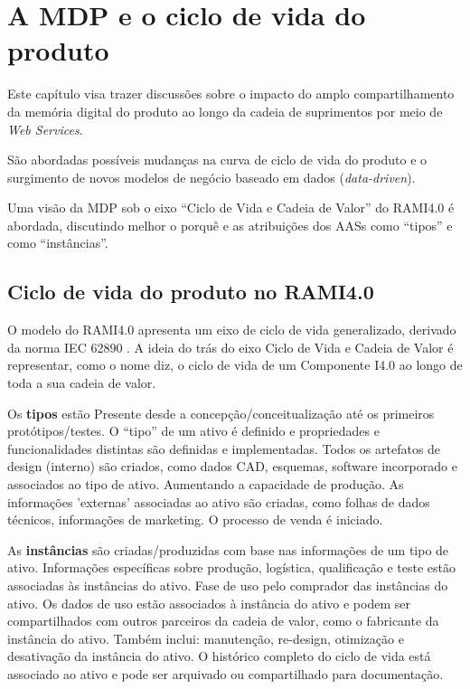\chapter{ A MDP e o ciclo de vida do produto }
\label{cha:ciclo-de-vida}
	
	Este capítulo visa trazer discussões sobre o impacto do amplo compartilhamento da memória digital do produto ao longo da cadeia de suprimentos por meio de \textit{Web Services}.
	
	São abordadas possíveis mudanças na curva de ciclo de vida do produto e o surgimento de novos modelos de negócio baseado em dados (\textit{data-driven}).
	
	Uma visão da MDP sob o eixo ``Ciclo de Vida e Cadeia de Valor'' do RAMI4.0 é abordada, discutindo melhor o porquê e as atribuições dos AASs como ``tipos'' e como ``instâncias''.
	
	

\section{ Ciclo de vida do produto no RAMI4.0 }

	O modelo do RAMI4.0 apresenta um eixo de ciclo de vida generalizado, derivado da norma IEC 62890 \cite{adolphs2015rami}. A ideia do trás do eixo Ciclo de Vida e Cadeia de Valor é representar, como o nome diz, o ciclo de vida de um Componente I4.0 ao longo de toda a sua cadeia de valor.
	
	Os \textbf{tipos} estão Presente desde a concepção/conceitualização até os primeiros protótipos/testes. O ``tipo'' de um ativo é definido e propriedades e funcionalidades distintas são definidas e implementadas. Todos os artefatos de design (interno) são criados, como dados CAD, esquemas, software incorporado e associados ao tipo de ativo. Aumentando a capacidade de produção. As informações 'externas' associadas ao ativo são criadas, como folhas de dados técnicos, informações de marketing. O processo de venda é iniciado.
	
	As \textbf{instâncias} são criadas/produzidas com base nas informações de um tipo de ativo. Informações específicas sobre produção, logística, qualificação e teste estão associadas às instâncias do ativo. Fase de uso pelo comprador das instâncias do ativo. Os dados de uso estão associados à instância do ativo e podem ser compartilhados com outros parceiros da cadeia de valor, como o fabricante da instância do ativo. Também inclui: manutenção, re-design, otimização e desativação da instância do ativo. O histórico completo do ciclo de vida está associado ao ativo e pode ser arquivado ou compartilhado para documentação.
	
